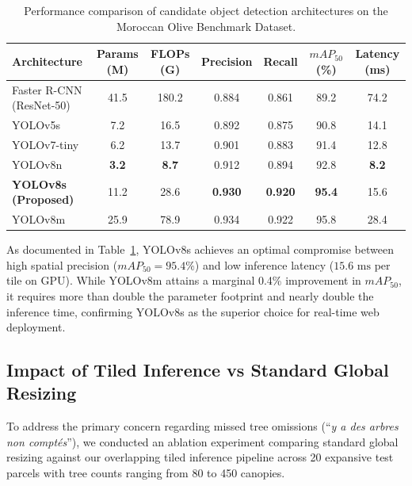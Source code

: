 \documentclass[runningheads]{llncs}
\begin{document}
\begin{table}[ht]
\centering
\caption{Performance comparison of candidate object detection architectures on the Moroccan Olive Benchmark Dataset.}
\label{tab:models}
\begin{tabular}{lcccccc}
\toprule
\textbf{Architecture} & \textbf{Params (M)} & \textbf{FLOPs (G)} & \textbf{Precision} & \textbf{Recall} & \textbf{$mAP_{50}$ (\%)} & \textbf{Latency (ms)} \\
\midrule
Faster R-CNN (ResNet-50) & 41.5 & 180.2 & 0.884 & 0.861 & 89.2 & 74.2 \\
YOLOv5s & 7.2 & 16.5 & 0.892 & 0.875 & 90.8 & 14.1 \\
YOLOv7-tiny & 6.2 & 13.7 & 0.901 & 0.883 & 91.4 & 12.8 \\
YOLOv8n & \textbf{3.2} & \textbf{8.7} & 0.912 & 0.894 & 92.8 & \textbf{8.2} \\
\textbf{YOLOv8s (Proposed)} & 11.2 & 28.6 & \textbf{0.930} & \textbf{0.920} & \textbf{95.4} & 15.6 \\
YOLOv8m & 25.9 & 78.9 & 0.934 & 0.922 & 95.8 & 28.4 \\
\bottomrule
\end{tabular}
\end{table}

As documented in Table~\ref{tab:models}, YOLOv8s achieves an optimal compromise between high spatial precision ($mAP_{50} = 95.4\%$) and low inference latency ($15.6\text{ ms}$ per tile on GPU). While YOLOv8m attains a marginal 0.4\% improvement in $mAP_{50}$, it requires more than double the parameter footprint and nearly double the inference time, confirming YOLOv8s as the superior choice for real-time web deployment.

\subsection{Impact of Tiled Inference vs Standard Global Resizing}
To address the primary concern regarding missed tree omissions (``\textit{y a des arbres non comptés}''), we conducted an ablation experiment comparing standard global resizing against our overlapping tiled inference pipeline across 20 expansive test parcels with tree counts ranging from 80 to 450 canopies.
\end{document}
